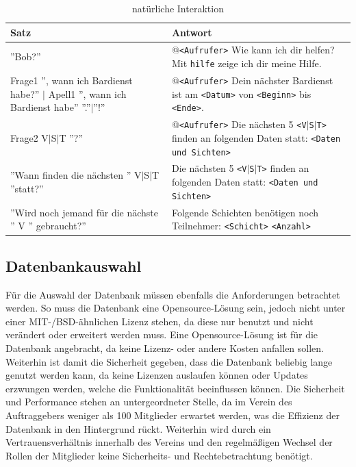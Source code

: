 \begin{table}[H]
\centering
\begin{tabularx}{\textwidth}{|p{5cm}|X|}
	\hline
	\textbf{Satz} & \textbf{Antwort} \\
	\hline
	''Bob?'' & @\texttt{<Aufrufer>} Wie kann ich dir helfen? Mit \texttt{hilfe} zeige ich dir meine Hilfe. \\
	\hline
	{Frage1 '', wann ich Bardienst habe?'' $|$ Apell1 '', wann ich Bardienst habe'' ''.''$|$''!''} & @\texttt{<Aufrufer>} Dein nächster Bardienst ist am \texttt{<Datum>} von \texttt{<Beginn>} bis \texttt{<Ende>}.\\
	\hline
	Frage2 V$|$S$|$T ''?'' & @\texttt{<Aufrufer>} Die nächsten 5 \texttt{<V$|$S$|$T>} finden an folgenden Daten statt: \texttt{<Daten und Sichten>}\\
	\hline
	''Wann finden die nächsten '' V$|$S$|$T ''statt?'' & Die nächsten 5 \texttt{<V$|$S$|$T>} finden an folgenden Daten statt: \texttt{<Daten und Sichten>}\\
	\hline
	''Wird noch jemand für die nächste '' V '' gebraucht?'' &  Folgende Schichten benötigen noch Teilnehmer: \texttt{<Schicht>} \texttt{<Anzahl>} \\
	\hline
\end{tabularx}
\caption{natürliche Interaktion}
\label{tab:natuerlicheinteraktion}
\end{table}


\subsection{Datenbankauswahl}

Für die Auswahl der Datenbank müssen ebenfalls die Anforderungen betrachtet werden. So muss die Datenbank eine Opensource-Lösung sein, jedoch nicht unter einer MIT-/BSD-ähnlichen Lizenz stehen, da diese nur benutzt und nicht verändert oder erweitert werden muss. Eine Opensource-Lösung ist für die Datenbank angebracht, da keine Lizenz- oder andere Kosten anfallen sollen. Weiterhin ist damit die Sicherheit gegeben, dass die Datenbank beliebig lange genutzt werden kann, da keine Lizenzen auslaufen können oder Updates erzwungen werden, welche die Funktionalität beeinflussen können. Die Sicherheit und Performance stehen an untergeordneter Stelle, da im Verein des Auftraggebers weniger als 100 Mitglieder erwartet werden, was die Effizienz der Datenbank in den Hintergrund rückt. Weiterhin wird durch ein Vertrauensverhältnis innerhalb des Vereins und den regelmäßigen Wechsel der Rollen der Mitglieder keine Sicherheits- und Rechtebetrachtung benötigt.

